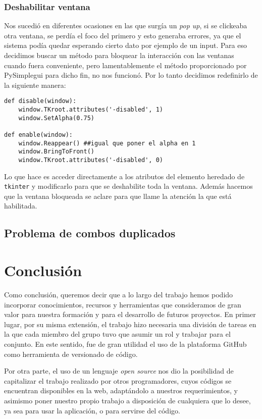 \subsection{Deshabilitar ventana}
Nos sucedió en diferentes ocasiones en las que surgía un \emph{pop up}, si se clickeaba otra ventana, se perdía el foco del primero y esto generaba errores, ya que el sistema podía quedar esperando cierto dato por ejemplo de un input.
Para eso decidimos buscar un método para bloquear la interacción con las ventanas cuando fuera conveniente, pero lamentablemente el método proporcionado por PySimplegui para dicho fin, no nos funcionó. Por lo tanto decidimos redefinirlo de la siguiente manera:

\begin{verbatim}
def disable(window):
	window.TKroot.attributes('-disabled', 1)
	window.SetAlpha(0.75)

def enable(window):
	window.Reappear() ##igual que poner el alpha en 1
	window.BringToFront()
	window.TKroot.attributes('-disabled', 0)
\end{verbatim}
Lo que hace es acceder directamente a los atributos del elemento heredado de \texttt{tkinter} y modificarlo para que se deshabilite toda la ventana. Además hacemos que la ventana bloqueada se aclare para que llame la atención la que está habilitada.
\section{Problema de combos duplicados}

\chapter{Conclusión}

Como conclusión, queremos decir que a lo largo del trabajo hemos podido incorporar conocimientos, recursos y herramientas que consideramos de gran valor para nuestra formación y para el desarrollo de futuros proyectos. En primer lugar, por su misma extensión, el trabajo hizo necesaria una división de tareas en la que cada miembro del grupo tuvo que asumir un rol y trabajar para el conjunto. En este sentido, fue de gran utilidad el uso de la plataforma GitHub como herramienta de versionado de código.

Por otra parte, el uso de un lenguaje \emph{open source} nos dio la posibilidad de capitalizar el trabajo realizado por otros programadores, cuyos códigos se encuentran disponibles en la web, adaptándolo a nuestros requerimientos, y asimismo poner nuestro propio trabajo a disposición de cualquiera que lo desee, ya sea para usar la aplicación, o para servirse del código.

